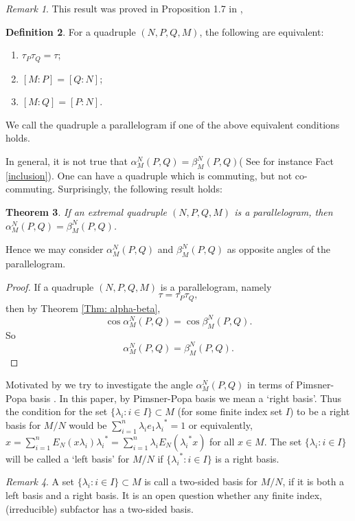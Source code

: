 \documentclass[11pt,letterpaper]{amsart}
\newtheorem{theorem}{Theorem}[section]
\theoremstyle{definition}
\newtheorem{definition}[theorem]{Definition}
\theoremstyle{remark}
\newtheorem{remark}[theorem]{Remark}
\begin{document}
\begin{remark}
This result was proved in Proposition 1.7 in \cite{Po5}, 
\end{remark}


\begin{definition}
For a quadruple $(N,P,Q,M)$, the following are equivalent:
\begin{enumerate}
\item $\tau_P \tau_Q=\tau$; 
\item $[M:P]=[Q:N]$;
\item $[M:Q]=[P:N]$. 
\end{enumerate}
We call the quadruple a parallelogram if one of the above equivalent conditions holds.
\end{definition}


In general, it is not true that $\alpha^N_M(P,Q)= \beta^N_M(P,Q)$( See for instance Fact \ref{inclusion}). One can have a quadruple which is commuting, but not co-commuting. 
Surprisingly, the following result holds:



\begin{theorem}\label{v}
If an extremal quadruple $(N,P,Q,M)$ is a parallelogram, then $\alpha^N_M(P,Q)=\beta^N_M(P,Q)$.
\end{theorem} 
Hence we may consider $\alpha^N_M(P,Q)$ and $\beta^N_M(P,Q)$ as opposite angles of the parallelogram. 


\begin{proof}
If a quadruple $(N,P,Q,M)$ is a parallelogram, namely 
$$\tau= \tau_P\tau_Q,$$
then by Theorem \ref{Thm: alpha-beta}, 
$$\cos \alpha^N_M(P, Q)= \cos \beta^N_M(P, Q).$$
So 
$$\alpha^N_M(P, Q)= \beta^N_M(P, Q).$$
\end{proof}


 Motivated by \cite{SW} we try to  investigate the angle $\alpha^N_M(P,Q)$ in terms of Pimsner-Popa basis \cite{PiPo}.
 In this paper, by Pimsner-Popa basis we mean a `right basis'. Thus the condition for the set $\{\lambda_i:i\in I\}\subset M$ (for some finite index set $I$)
 to be a right basis for $M/N$ would be $\sum_{i=1}^n \lambda_i e_1 {\lambda_i}^*=1$ or equivalently,
 $x = \sum_{i=1}^n E_N(x \lambda_i){\lambda_i}^*
=\sum_{i=1}^n \lambda_i E_N({\lambda_i}^* x)$ for all $x\in M$. The set $\{\lambda_i:i\in I\}$ will be called a `left basis' for $M/N$ if $\{{\lambda_i}^*:i\in I\}$ is a right basis.

\begin{remark}
A set $\{\lambda_i:i\in I\}\subset M$ is call a two-sided basis for $M/N$, if it is both a left basis and a right basis. It is an open question whether any finite index, (irreducible) subfactor has a two-sided basis.
\end{remark}
\end{document}
